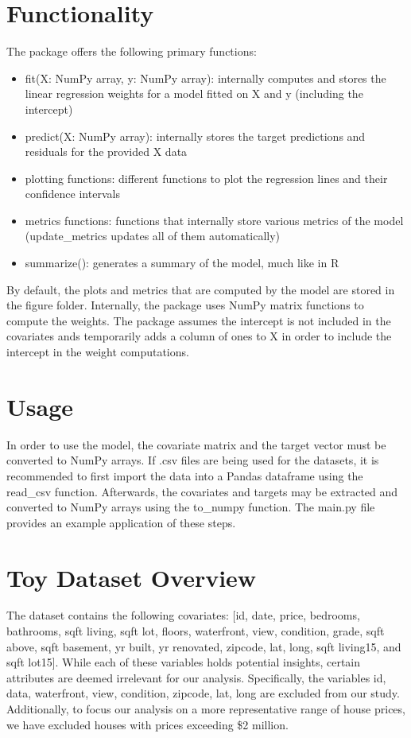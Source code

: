 \documentclass[11pt,a4paper]{article}
\begin{document}
\section{Functionality}
The package offers the following primary functions:
\begin{itemize}
    \item fit(X: NumPy array, y: NumPy array): internally computes and stores the linear
          regression weights for a model fitted on X and y (including the intercept)
    \item predict(X: NumPy array): internally stores the target predictions and residuals
          for the provided X data
    \item plotting functions: different functions to plot the regression lines and their
          confidence intervals
    \item metrics functions: functions that internally store various metrics of the model
          (update\_metrics updates all of them automatically)
    \item summarize(): generates a summary of the model, much like in R
\end{itemize}
By default, the plots and metrics that are computed by the model are stored in the figure folder. Internally, the package uses NumPy matrix functions to compute the weights.
The package assumes the intercept is not included in the covariates ands temporarily adds a column of ones to X in order to include the intercept in the weight computations.

\newpage
\section{Usage}
In order to use the model, the covariate matrix and the target vector must be
converted to NumPy arrays. If .csv files are being used for the datasets, it is
recommended to first import the data into a Pandas dataframe using the
read\_csv function. Afterwards, the covariates and targets may be extracted and
converted to NumPy arrays using the to\_numpy function. The main.py file
provides an example application of these steps.

\newpage
\section{Toy Dataset Overview}
The dataset contains the following covariates: [id, date, price, bedrooms,
bathrooms, sqft living, sqft lot, floors, waterfront, view, condition, grade,
sqft above, sqft basement, yr built, yr renovated, zipcode, lat, long, sqft
living15, and sqft lot15]. While each of these variables holds potential
insights, certain attributes are deemed irrelevant for our analysis.
Specifically, the variables id, data, waterfront, view, condition, zipcode,
lat, long are excluded from our study. Additionally, to focus our analysis on a
more representative range of house prices, we have excluded houses with prices
exceeding \$2 million.
\end{document}
